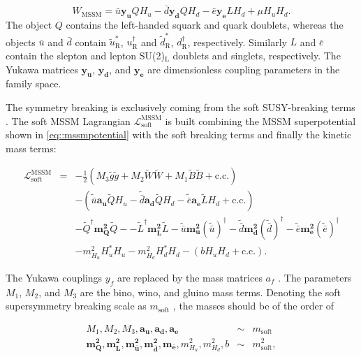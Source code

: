 \begin{equation}
W_{\mathrm{MSSM}} = \bar{u}\mathbf{y_u}QH_u - \bar{d}\mathbf{y_d}QH_d - \bar{e}\mathbf{y_e}LH_d + \mu H_uH_d.
\label{eq::mssmpotential}
\end{equation}
The object $Q$ contains the left-handed squark and quark doublets, whereas the objects $\bar{u}$ and $\bar{d}$ contain $\widetilde{u}^*_{\text{R}}$, ${u}^\dag_{\text{R}}$ and $\widetilde{d}^*_{\text{R}}$, ${d}^\dag_{\text{R}}$, respectively. Similarly $L$ and $\bar{e}$ contain the slepton and lepton SU(2)$_{\mathrm{L}}$ doublets and singlets, respectively. The Yukawa matrices $\mathbf{y_u}$, $\mathbf{y_d}$, and $\mathbf{y_e}$ are dimensionless coupling parameters in the family space.

The symmetry breaking is exclusively coming from the soft SUSY-breaking terms \cite{Martin:1997ns}. The soft MSSM Lagrangian $\mathcal{L}_{\mathrm{soft}}^{\mathrm{MSSM}}$ is built combining the MSSM superpotential shown in \autoref{eq::mssmpotential} with the soft breaking terms and finally the kinetic mass terms\cite{Martin:1997ns}:

\begin{eqnarray}
\mathcal{L}_{\mathrm{soft}}^{\mathrm{MSSM}} &=& -\frac{1}{2}\left(M_3\widetilde{g}\widetilde{g} + M_2 \widetilde{W}\widetilde{W} + M_1\widetilde{B}\widetilde{B} + \mathrm{c.c.}\right)\nonumber\\
& & -\left(\widetilde{\bar{u}}\mathbf{a_u}\widetilde{Q}H_u - \widetilde{\bar{d}}\mathbf{a_d}\widetilde{Q}H_d  - \widetilde{\bar{e}}\mathbf{a_e}\widetilde{L}H_d + \mathrm{c.c.}\right)\nonumber\\
& & -\widetilde{Q}^\dag\mathbf{m_Q^2}\widetilde{Q} - -\widetilde{L}^\dag\mathbf{m_L^2}\widetilde{L} - \widetilde{\bar{u}}\mathbf{m_u^2}(\widetilde{\bar{u}})^\dag - \widetilde{\bar{d}}\mathbf{m_d^2}(\widetilde{\bar{d}})^\dag - \widetilde{\bar{e}}\mathbf{m_e^2}(\widetilde{\bar{e}})^\dag\nonumber\\
& & - m_{H_u}^2H_u^*H_u - m_{H_d}^2H_d^*H_d -(bH_uH_d + \mathrm{c.c.}).
\label{eqn:lmssm_soft}
\end{eqnarray}

The Yukawa couplings $y_{f}$ are replaced by the mass matrices $a_{f}$ \cite{Martin:1997ns}. The parameters $M_1$, $M_2$, and $M_3$ are the bino, wino, and gluino mass terms. Denoting the soft supersymmetry breaking scale as $m_{\mathrm{soft}}$ \cite{Martin:1997ns}, the masses should be of the order of

\begin{eqnarray}
M_1, M_2, M_3, \mathbf{a_u}, \mathbf{a_d}, \mathbf{a_e} &\sim& m_{\mathrm{soft}}\nonumber\\
\mathbf{m_Q^2}, \mathbf{m_L^2}, \mathbf{m_{\bar{u}}^2}, \mathbf{m_{\bar{d}}^2}, \mathbf{m_{\bar{e}}}, m_{H_u}^2, m_{H_d}^2, b &\sim& m_{\mathrm{soft}}^2,
\label{eqn:massscalesmssm}
\end{eqnarray}

